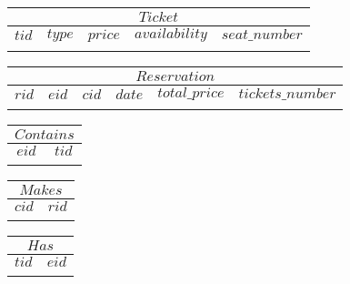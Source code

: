 \documentclass{article}
\begin{document}
\vspace{10pt}

\noindent
\begin{tabular}{|c|c|c|c|c|}
\hline
\multicolumn{5}{|c|}{$Ticket$} \\
\hline
$tid$ & $type$ & $price$ & $availability$ & $seat\_number$ \\
\hline
& & & & \\
\hline
\end{tabular}

\vspace{10pt}

\noindent
\begin{tabular}{|c|c|c|c|c|c|}
\hline
\multicolumn{6}{|c|}{$Reservation$} \\
\hline
$rid$ & $eid$ & $cid$ & $date$ & $total\_price$ & $tickets\_number$ \\
\hline
& & & & & \\
\hline
\end{tabular}

\vspace{10pt}


\noindent
\begin{tabular}{|c|c|}
\hline
\multicolumn{2}{|c|}{$Contains$} \\
\hline
$eid$ & $tid$ \\
\hline
& \\
\hline
\end{tabular}

\vspace{5pt}

\noindent
\begin{tabular}{|c|c|}
\hline
\multicolumn{2}{|c|}{$Makes$} \\
\hline
$cid$ & $rid$ \\
\hline
& \\
\hline
\end{tabular}

\vspace{5pt}

\noindent
\begin{tabular}{|c|c|}
\hline
\multicolumn{2}{|c|}{$Has$} \\
\hline
$tid$ & $eid$ \\
\hline
& \\
\hline
\end{tabular}
\end{document}
